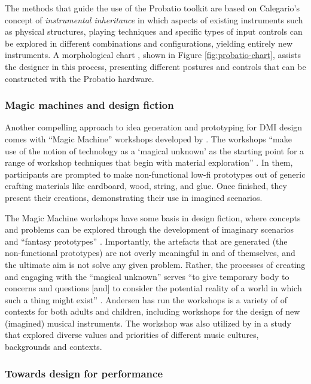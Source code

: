 \documentclass[letterpaper, 12pt]{article}
\begin{document}
The methods that guide the use of the Probatio toolkit are based on Calegario's concept of \emph{instrumental inheritance} in which aspects of existing instruments such as physical structures, playing techniques and specific types of input controls can be explored in different combinations and configurations, yielding entirely new instruments. A morphological chart \citep{Cross2000}, shown in Figure \ref{fig:probatio-chart}, assists the designer in this process, presenting different postures and controls that can be constructed with the Probatio hardware.

\subsubsection{Magic machines and design fiction}

Another compelling approach to idea generation and prototyping for DMI design comes with ``Magic Machine'' workshops developed by \citet{Andersen2017}. The workshops ``make use of the notion of technology as a `magical unknown' as the starting point for a range of workshop techniques that begin with material exploration'' \citep[p. 4971]{Blythe2016}. In them, participants are prompted to make non-functional low-fi prototypes out of generic crafting materials like cardboard, wood, string, and glue. Once finished, they present their creations, demonstrating their use in imagined scenarios.

The Magic Machine workshops have some basis in design fiction, where concepts and problems can be explored through the development of imaginary scenarios and ``fantasy prototypes'' \citep{Sterling2009}. Importantly, the artefacts that are generated (the non-functional prototypes) are not overly meaningful in and of themselves, and the ultimate aim is not solve any given problem. Rather, the processes of creating and engaging with the ``magical unknown'' serves ``to give temporary body to concerns and questions [and] to consider the potential reality of a world in which such a thing might exist'' \citep[p. 4971]{Blythe2016}. Andersen has run the workshops is a variety of of contexts for both adults and children, including workshops for the design of new (imagined) musical instruments. The workshop was also utilized by \citet{Lepri2019} in a study that explored diverse values and priorities of different music cultures, backgrounds and contexts.

\subsubsection{Towards design for performance}
\label{towards-design-for-performance}
\end{document}
